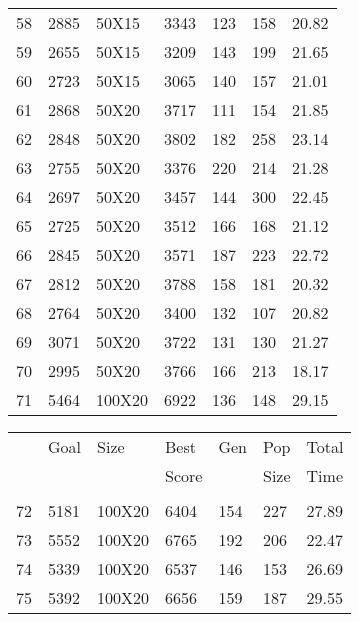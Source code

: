 \documentclass[14pt]{acmsiggraph}
\begin{document}
\begin{table}[h!]
\begin{center}
{\begin{tabular}{lllllll||}
					58  & 2885 & 50X15  & \cellcolor[rgb]{0.61,0.75,0.35}3343 & 123 & 158  & 20.82 \\
					59  & 2655 & 50X15  & \cellcolor[rgb]{0.67,0.77,0.37}3209 & 143 & 199  & 21.65 \\
					60  & 2723 & 50X15  & \cellcolor[rgb]{0.57,0.73,0.33}3065 & 140 & 157  & 21.01 \\
					61  & 2868 & 50X20  & \cellcolor[rgb]{0.76,0.81,0.41}3717 & 111 & 154  & 21.85 \\
					62  & 2848 & 50X20  & \cellcolor[rgb]{0.81,0.83,0.43}3802 & 182 & 258  & 23.14 \\
					63  & 2755 & 50X20  & \cellcolor[rgb]{0.69,0.78,0.38}3376 & 220 & 214  & 21.28 \\
					64  & 2697 & 50X20  & \cellcolor[rgb]{0.75,0.81,0.41}3457 & 144 & 300  & 22.45 \\
					65  & 2725 & 50X20  & \cellcolor[rgb]{0.76,0.81,0.41}3512 & 166 & 168  & 21.12 \\
					66  & 2845 & 50X20  & \cellcolor[rgb]{0.72,0.8,0.4}3571   & 187 & 223  & 22.72 \\
					67  & 2812 & 50X20  & \cellcolor[rgb]{0.82,0.84,0.44}3788 & 158 & 181  & 20.32 \\
					68  & 2764 & 50X20  & \cellcolor[rgb]{0.69,0.78,0.38}3400 & 132 & 107  & 20.82 \\
					69  & 3071 & 50X20  & \cellcolor[rgb]{0.67,0.78,0.37}3722 & 131 & 130  & 21.27 \\
					70  & 2995 & 50X20  & \cellcolor[rgb]{0.72,0.8,0.4}3766   & 166 & 213  & 18.17 \\
					71  & 5464 & 100X20 & \cellcolor[rgb]{0.73,0.8,0.4}6922   & 136 & 148  & 29.15 \\
				\end{tabular}\centering
			}
			\subtable
			{
				\begin{tabular}{||lllllll}
					 & Goal   & Size   & Best & Gen & Pop & Total \\ 
					 &  &    & Score &   &  Size & Time\\ \hline
					 &  &   &  &   &   &  \\ 
					72  & 5181 & 100X20 & \cellcolor[rgb]{0.7,0.79,0.38}6404  & 154 & 227  & 27.89 \\
					73  & 5552 & 100X20 & \cellcolor[rgb]{0.68,0.78,0.38}6765 & 192 & 206  & 22.47 \\
					74  & 5339 & 100X20 & \cellcolor[rgb]{0.69,0.78,0.38}6537 & 146 & 153  & 26.69 \\
					75  & 5392 & 100X20 & \cellcolor[rgb]{0.7,0.79,0.38}6656  & 159 & 187  & 29.55 \\

\end{tabular}}
\end{center}
\end{table}
\end{document}
